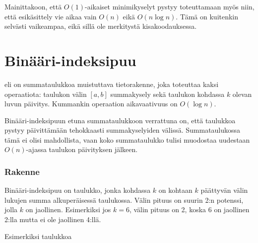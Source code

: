 Mainittakoon, että $O(1)$-aikaiset minimikyselyt pystyy
toteuttamaan myös niin, että esikäsittely vie aikaa
vain $O(n)$ eikä $O(n \log n)$.
Tämä on kuitenkin selvästi vaikeampaa, eikä 
sillä ole merkitystä kisakoodauksessa.

\section{Binääri-indeksipuu}


 eli  on
summataulukkoa muistuttava tietorakenne,
joka toteuttaa kaksi operaatiota:
taulukon välin $[a,b]$ summakysely
sekä taulukon kohdassa $k$ olevan luvun päivitys.
Kummankin operaation aikavaativuus on $O(\log n)$.

Binääri-indeksipuun etuna summataulukkoon verrattuna on,
että taulukkoa pystyy päivittämään tehokkaasti
summakyselyiden välissä.
Summataulukossa tämä ei olisi mahdollista,
vaan koko summataulukko tulisi muodostaa uudestaan $O(n)$-ajassa
taulukon päivityksen jälkeen.

\subsubsection{Rakenne}

Binääri-indeksipuu on taulukko, jonka
kohdassa $k$ on kohtaan $k$ päättyvän välin lukujen summa
alkuperäisessä taulukossa.
Välin pituus on suurin 2:n potenssi, jolla $k$ on jaollinen.
Esimerkiksi jos $k=6$, välin pituus on 2, koska
6 on jaollinen 2:lla mutta ei ole jaollinen 4:llä.

\begin{samepage}
Esimerkiksi taulukkoa
\begin{center}
\end{center}
\end{samepage}

